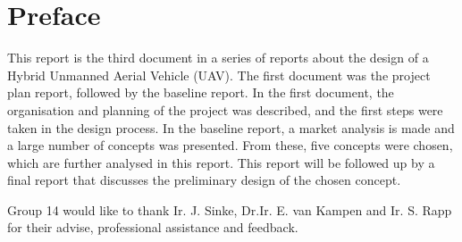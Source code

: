 \chapter*{Preface}

This report is the third document in a series of reports about the design of a Hybrid Unmanned Aerial Vehicle (UAV). The first document was the project plan report, followed by the baseline report. In the first document, the organisation and planning of the project was described, and the first steps were taken in the design process. In the baseline report, a market analysis is made and a large number of concepts was presented. From these, five concepts were chosen, which are further analysed in this report. This report will be followed up by a final report that discusses the preliminary design of the chosen concept.

Group 14 would like to thank Ir. J. Sinke, Dr.Ir. E. van Kampen and Ir. S. Rapp for their advise, professional assistance and feedback. 